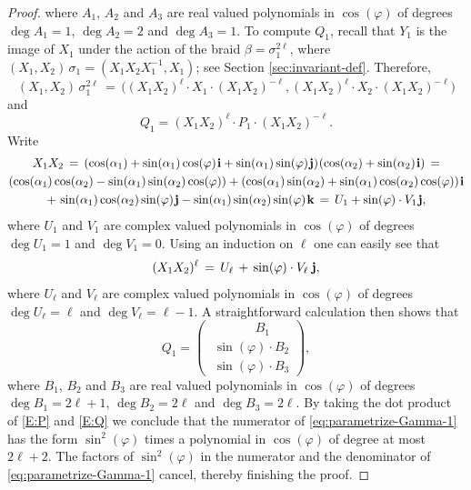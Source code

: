 \documentclass[11pt,reqno]{amsart}
\theoremstyle{definition}
\renewcommand{\phi}{\varphi}
\renewcommand{\i}{\mspace{1.5mu}\mathbf i}
\renewcommand{\j}{\mspace{1.5mu}\mathbf j}
\renewcommand{\k}{\mspace{1.5mu}\mathbf k}
\begin{document}
\begin{sloppypar}
\begin{proof}
\medskip\noindent
where $A_1$, $A_2$ and $A_3$ are real valued polynomials in $\cos(\phi)$ of degrees $\deg A_1 = 1$, $\deg A_2 = 2$ and $\deg A_3 = 1$. To compute $Q_1$, recall that $Y_1$ is the image of $X_1$ under the action of the braid $\beta = \sigma_1^{2 \ell}$, where $(X_1, X_2)\,\sigma_1 = (X_1 X_2 X_1^{- 1}, X_1)$; see Section \ref{sec:invariant-def}. Therefore, 
\[
(X_1, X_2)\,\sigma_1^{2 \ell} \, = \, \big( (X_1 X_2)^{\ell} \cdot X_1 \cdot (X_1 X_2)^{- \ell}, (X_1 X_2)^{\ell} \cdot X_2 \cdot (X_1 X_2)^{- \ell} \big)
\]
and 
\[
Q_1 = (X_1 X_2)^{\ell} \cdot P_1 \cdot (X_1 X_2)^{- \ell}.
\]
Write
\begin{multline*}
X_1 X_2 \, = \, (\cos(\alpha_1) + \sin (\alpha_1)\cos(\phi)\i + \sin(\alpha_1)\sin(\phi)\j)\mspace{1mu}(\cos(\alpha_2) +\sin(\alpha_2) \i)\, = \\ 
(\cos(\alpha_1) \cos(\alpha_2) - \sin(\alpha_1) \sin(\alpha_2) \cos (\phi)) +
(\cos(\alpha_1) \sin(\alpha_2) + \sin(\alpha_1) \cos(\alpha_2) \cos (\phi))\i \\
+\, \sin(\alpha_1)\cos (\alpha_2) \sin (\phi)\j - \sin(\alpha_1)\sin(\alpha_2)\sin(\phi)\k 
\, =\,  U_1 + \sin(\phi)\cdot V_1 \j,
\end{multline*}
where $U_1$ and $V_1$ are complex valued polynomials in $\cos(\phi)$ of degrees $\deg U_1 = 1$ and $\deg V_1 = 0$. Using an induction on $\ell$ one can easily see that 
\[
(X_1 X_2)^{\ell} \, = \, U_{\ell}\, +\, \sin(\phi)\cdot V_{\ell}\, \j,
\]
where $U_{\ell}$ and $V_{\ell}$ are complex valued polynomials in $\cos(\phi)$ of degrees $\deg U_{\ell} = \ell$ and $\deg V_{\ell} = \ell - 1$. A straightforward calculation then shows that
\begin{equation}\label{E:Q}
Q_1 = \begin{pmatrix}
\;\qquad\quad\; B_1 \\
\;\sin(\phi) \cdot B_2 \\
\;\sin(\phi) \cdot B_3
\end{pmatrix},
\end{equation}
where $B_1$, $B_2$ and $B_3$ are real valued polynomials in $\cos(\phi)$ of degrees $\deg B_1 = 2\ell + 1$, $\deg B_2 = 2\ell$ and $\deg B_3 = 2\ell$. By taking the dot product of \eqref{E:P} and \eqref{E:Q} we conclude that the numerator of \eqref{eq:parametrize-Gamma-1} has the form $\sin^2(\phi)$ times a polynomial in $\cos(\phi)$ of degree at most $2\ell + 2$. The factors of $\sin^2(\phi)$ in the numerator and the denominator of \eqref{eq:parametrize-Gamma-1} cancel, thereby finishing the proof.
\end{proof}


\end{sloppypar}
\end{document}
